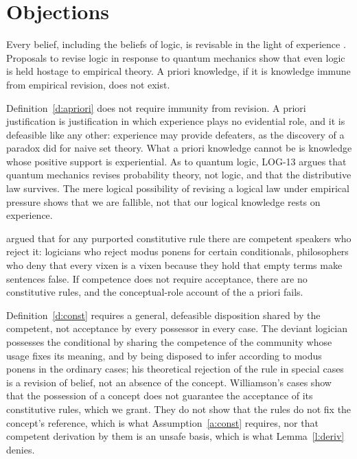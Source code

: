 \documentclass{situationist-preprint}
\begin{document}
\section{Objections}

\begin{objection}[Revisability]
Every belief, including the beliefs of logic, is revisable in the light of experience \citep{Quine1951}. Proposals to revise logic in response to quantum mechanics show that even logic is held hostage to empirical theory. A priori knowledge, if it is knowledge immune from empirical revision, does not exist.
\end{objection}

\begin{reply}
Definition~\ref{d:apriori} does not require immunity from revision. A priori justification is justification in which experience plays no evidential role, and it is defeasible like any other: experience may provide defeaters, as the discovery of a paradox did for naive set theory. What a priori knowledge cannot be is knowledge whose positive support is experiential. As to quantum logic, LOG-13 argues that quantum mechanics revises probability theory, not logic, and that the distributive law survives. The mere logical possibility of revising a logical law under empirical pressure shows that we are fallible, not that our logical knowledge rests on experience.
\end{reply}

\begin{objection}
\citet{Williamson2007} argued that for any purported constitutive rule there are competent speakers who reject it: logicians who reject modus ponens for certain conditionals, philosophers who deny that every vixen is a vixen because they hold that empty terms make sentences false. If competence does not require acceptance, there are no constitutive rules, and the conceptual-role account of the a priori fails.
\end{objection}

\begin{reply}
Definition~\ref{d:const} requires a general, defeasible disposition shared by the competent, not acceptance by every possessor in every case. The deviant logician possesses the conditional by sharing the competence of the community whose usage fixes its meaning, and by being disposed to infer according to modus ponens in the ordinary cases; his theoretical rejection of the rule in special cases is a revision of belief, not an absence of the concept. Williamson's cases show that the possession of a concept does not guarantee the acceptance of its constitutive rules, which we grant. They do not show that the rules do not fix the concept's reference, which is what Assumption~\ref{a:const} requires, nor that competent derivation by them is an unsafe basis, which is what Lemma~\ref{l:deriv} denies.
\end{reply}
\end{document}
